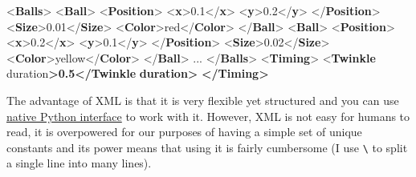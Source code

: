 \documentclass[
]{book}
\newenvironment{Shaded}{\begin{snugshade}}{\end{snugshade}}
\newcommand{\ErrorTok}[1]{\textcolor[rgb]{0.64,0.00,0.00}{\textbf{#1}}}
\newcommand{\KeywordTok}[1]{\textcolor[rgb]{0.13,0.29,0.53}{\textbf{#1}}}
\newcommand{\NormalTok}[1]{#1}
\newcommand{\OtherTok}[1]{\textcolor[rgb]{0.56,0.35,0.01}{#1}}
\begin{document}
\begin{Shaded}
\begin{Highlighting}[]
\NormalTok{\textless{}}\KeywordTok{Balls}\NormalTok{\textgreater{}}
\NormalTok{  \textless{}}\KeywordTok{Ball}\NormalTok{\textgreater{}}
\NormalTok{    \textless{}}\KeywordTok{Position}\NormalTok{\textgreater{}}
\NormalTok{      \textless{}}\KeywordTok{x}\NormalTok{\textgreater{}0.1\textless{}/}\KeywordTok{x}\NormalTok{\textgreater{}}
\NormalTok{      \textless{}}\KeywordTok{y}\NormalTok{\textgreater{}0.2\textless{}/}\KeywordTok{y}\NormalTok{\textgreater{}}
\NormalTok{    \textless{}/}\KeywordTok{Position}\NormalTok{\textgreater{}}
\NormalTok{    \textless{}}\KeywordTok{Size}\NormalTok{\textgreater{}0.01\textless{}/}\KeywordTok{Size}\NormalTok{\textgreater{}}
\NormalTok{    \textless{}}\KeywordTok{Color}\NormalTok{\textgreater{}red\textless{}/}\KeywordTok{Color}\NormalTok{\textgreater{}}
\NormalTok{  \textless{}/}\KeywordTok{Ball}\NormalTok{\textgreater{}}
\NormalTok{  \textless{}}\KeywordTok{Ball}\NormalTok{\textgreater{}}
\NormalTok{    \textless{}}\KeywordTok{Position}\NormalTok{\textgreater{}}
\NormalTok{      \textless{}}\KeywordTok{x}\NormalTok{\textgreater{}0.2\textless{}/}\KeywordTok{x}\NormalTok{\textgreater{}}
\NormalTok{      \textless{}}\KeywordTok{y}\NormalTok{\textgreater{}0.1\textless{}/}\KeywordTok{y}\NormalTok{\textgreater{}}
\NormalTok{    \textless{}/}\KeywordTok{Position}\NormalTok{\textgreater{}}
\NormalTok{    \textless{}}\KeywordTok{Size}\NormalTok{\textgreater{}0.02\textless{}/}\KeywordTok{Size}\NormalTok{\textgreater{}}
\NormalTok{    \textless{}}\KeywordTok{Color}\NormalTok{\textgreater{}yellow\textless{}/}\KeywordTok{Color}\NormalTok{\textgreater{}}
\NormalTok{  \textless{}/}\KeywordTok{Ball}\NormalTok{\textgreater{}}
\NormalTok{  ...}
\NormalTok{\textless{}/}\KeywordTok{Balls}\NormalTok{\textgreater{}}
\NormalTok{\textless{}}\KeywordTok{Timing}\NormalTok{\textgreater{}}
\NormalTok{  \textless{}}\KeywordTok{Twinkle}\OtherTok{ duration}\ErrorTok{\textgreater{}0.5\textless{}/Twinkle} \ErrorTok{duration\textgreater{}}
\ErrorTok{\textless{}/Timing\textgreater{}}
\end{Highlighting}
\end{Shaded}

The advantage of XML is that it is very flexible yet structured and you can use \href{https://docs.python.org/3/library/xml.html}{native Python interface} to work with it. However, XML is not easy for humans to read, it is overpowered for our purposes of having a simple set of unique constants and its power means that using it is fairly cumbersome (I use \texttt{\textbackslash{}} to split a single line into many lines).
\end{document}
